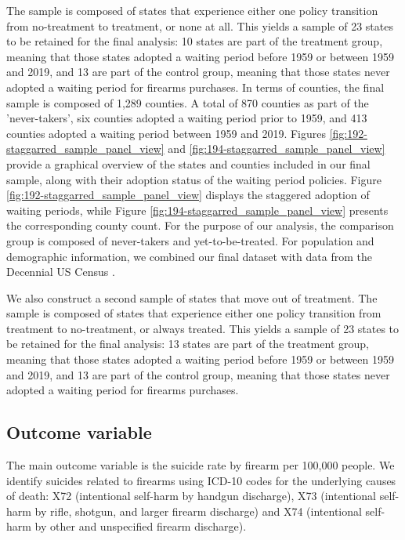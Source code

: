 The sample is composed of states that experience either one policy transition from no-treatment to treatment, or none at all. This yields a sample of 23 states to be retained for the final analysis: 10 states are part of the treatment group, meaning that those states adopted a waiting period before 1959 or between 1959 and 2019, and 13 are part of the control group, meaning that those states never adopted a waiting period for firearms purchases. In terms of counties, the final sample is composed of 1,289 counties. A total of 870 counties as part of the 'never-takers', six counties adopted a waiting period prior to 1959, and 413 counties adopted a waiting period between 1959 and 2019. Figures \ref{fig:192-staggarred_sample_panel_view} and \ref{fig:194-staggarred_sample_panel_view} provide a graphical overview of the states and counties included in our final sample, along with their adoption status of the waiting period policies. Figure \ref{fig:192-staggarred_sample_panel_view} displays the staggered adoption of waiting periods, while Figure \ref{fig:194-staggarred_sample_panel_view} presents the corresponding county count. For the purpose of our analysis, the comparison group is composed of never-takers and yet-to-be-treated. For population and demographic information, we combined our final dataset with data from the Decennial US Census \autocite{uscensus2020}. 

We also construct a second sample of states that move out of treatment. The sample is composed of states that experience either one policy transition from treatment to no-treatment, or always treated. This yields a sample of 23 states to be retained for the final analysis: 13 states are part of the treatment group, meaning that those states adopted a waiting period before 1959 or between 1959 and 2019, and 13 are part of the control group, meaning that those states never adopted a waiting period for firearms purchases.

\subsection*{Outcome variable}

The main outcome variable is the suicide rate by firearm per 100,000 people. We identify suicides related to firearms using ICD-10 codes for the underlying causes of death: X72 (intentional self-harm by handgun discharge), X73 (intentional self-harm by rifle, shotgun, and larger firearm discharge) and X74 (intentional self-harm by other and unspecified firearm discharge).

